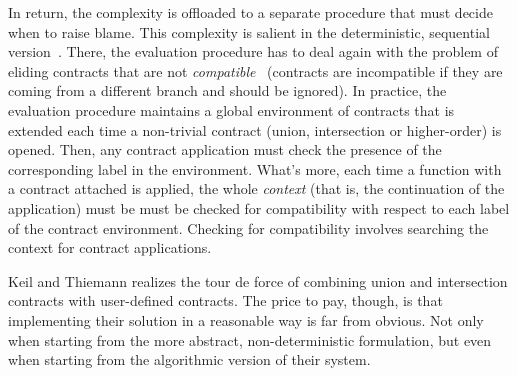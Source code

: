 \documentclass[sigplan,10pt,review,anonymous]{acmart}
\begin{document}
In return, the complexity is offloaded to a separate procedure that must decide
when to raise blame. This complexity is salient in the deterministic, sequential
version~\cite[Section 5.1]{KeilThiemannUnionIntersection}. There,
the evaluation procedure has to deal again with the problem of eliding contracts
that are not \emph{compatible}~\cite[Section 5.1]{KeilThiemannUnionIntersection} (contracts are incompatible
if they are coming from a different branch and should be ignored). In practice,
the evaluation procedure maintains a global environment of contracts that is
extended each time a non-trivial contract (union, intersection or higher-order)
is opened. Then, any contract application must check the presence of the
corresponding label in the environment. What's more, each time a function with a contract attached is applied,
the whole \emph{context} (that is, the continuation of the application) must be
must be checked for compatibility with respect to each label of the contract
environment. Checking for compatibility involves searching the context for
contract applications.

Keil and Thiemann realizes the tour de force of combining union and intersection
contracts with user-defined contracts. The price to pay, though, is that
implementing their solution in a reasonable way is far from obvious. Not only
when starting from the more abstract, non-deterministic formulation, but even
when starting from the algorithmic version of their system.
\end{document}
